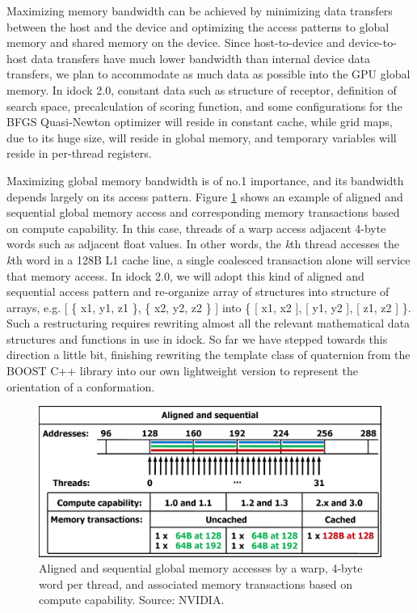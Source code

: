Maximizing memory bandwidth can be achieved by minimizing data transfers between the host and the device and optimizing the access patterns to global memory and shared memory on the device. Since host-to-device and device-to-host data transfers have much lower bandwidth than internal device data transfers, we plan to accommodate as much data as possible into the GPU global memory. In idock 2.0, constant data such as structure of receptor, definition of search space, precalculation of scoring function, and some configurations for the BFGS Quasi-Newton optimizer will reside in constant cache, while grid maps, due to its huge size, will reside in global memory, and temporary variables will reside in per-thread registers.

Maximizing global memory bandwidth is of no.1 importance, and its bandwidth depends largely on its access pattern. Figure \ref{GPU:AlignedSequentialGlobalMemoryAccess} shows an example of aligned and sequential global memory access and corresponding memory transactions based on compute capability. In this case, threads of a warp access adjacent 4-byte words such as adjacent float values. In other words, the \textit{k}th thread accesses the \textit{k}th word in a 128B L1 cache line, a single coalesced transaction alone will service that memory access. In idock 2.0, we will adopt this kind of aligned and sequential access pattern and re-organize array of structures into structure of arrays, e.g.  [ \{ x1, y1, z1 \}, \{ x2, y2, z2 \} ] into \{ [ x1, x2 ], [ y1, y2 ], [ z1, z2 ] \}. Such a restructuring requires rewriting almost all the relevant mathematical data structures and functions in use in idock. So far we have stepped towards this direction a little bit, finishing rewriting the template class of quaternion from the BOOST C++ library into our own lightweight version to represent the orientation of a conformation.

\begin{figure}
\centering
\includegraphics[width=\linewidth]{GPU/AlignedSequentialGlobalMemoryAccess.png}
\caption{Aligned and sequential global memory accesses by a warp, 4-byte word per thread, and associated memory transactions based on compute capability. Source: NVIDIA.}
\label{GPU:AlignedSequentialGlobalMemoryAccess}
\end{figure}


